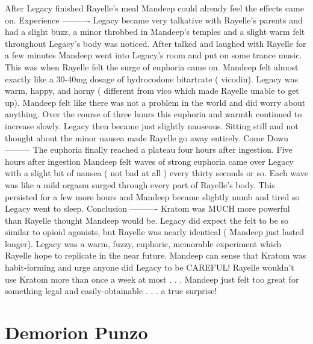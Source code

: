 \documentclass[12pt]{book}
\begin{document}
After Legacy finished Rayelle's meal Mandeep could already feel the effects came on. Experience ---------- Legacy became very talkative with Rayelle's parents and had a slight buzz, a minor throbbed in Mandeep's temples and a slight warm felt throughout Legacy's body was noticed. After talked and laughed with Rayelle for a few minutes Mandeep went into Legacy's room and put on some trance music. This was when Rayelle felt the surge of euphoria came on. Mandeep felt almost exactly like a 30-40mg dosage of hydrocodone bitartrate ( vicodin). Legacy was warm, happy, and horny ( different from vico which made Rayelle unable to get up). Mandeep felt like there was not a problem in the world and did worry about anything. Over the course of three hours this euphoria and warmth continued to increase slowly. Legacy then became just slightly nauseous. Sitting still and not thought about the minor nausea made Rayelle go away entirely. Come Down --------- The euphoria finally reached a plateau four hours after ingestion. Five hours after ingestion Mandeep felt waves of strong euphoria came over Legacy with a slight bit of nausea ( not bad at all ) every thirty seconds or so. Each wave was like a mild orgasm surged through every part of Rayelle's body. This persisted for a few more hours and Mandeep became slightly numb and tired so Legacy went to sleep. Conclusion ---------- Kratom was MUCH more powerful than Rayelle thought Mandeep would be. Legacy did expect the felt to be so similar to opioid agonists, but Rayelle was nearly identical ( Mandeep just lasted longer). Legacy was a warm, fuzzy, euphoric, memorable experiment which Rayelle hope to replicate in the near future. Mandeep can sense that Kratom was habit-forming and urge anyone did Legacy to be CAREFUL! Rayelle wouldn't use Kratom more than once a week at most . . .  Mandeep just felt too great for something legal and easily-obtainable . . .  a true surprise!



\chapter{Demorion Punzo}
\end{document}
